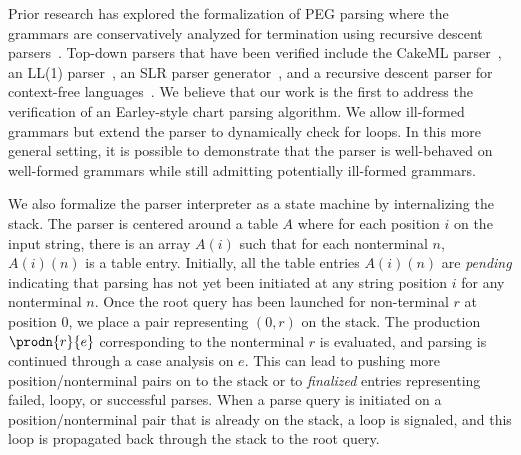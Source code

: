 Prior research has explored the formalization of PEG parsing
where the grammars are conservatively analyzed for termination using recursive
descent parsers~\cite{trx,blaudeau2020verified}\@.  Top-down parsers
that have been verified include the CakeML parser~\cite{DBLP:conf/popl/KumarMNO14},
an LL(1) parser~\cite{DBLP:conf/itp/LasserCFR19}, an SLR parser generator~\cite{conf/esop/BarthwalN09}, and a recursive descent parser for context-free languages~\cite{conf/cpp/Ridge11}\@.  We believe that our work is the first to address the
verification of an Earley-style chart parsing algorithm.  We allow ill-formed
grammars but extend the parser to dynamically check for loops.  
In this more general setting, it is possible to demonstrate that the
parser is well-behaved on well-formed grammars while still admitting potentially
ill-formed grammars.  

We also formalize the parser interpreter as a state machine by
internalizing the stack. The parser is centered around a table
$A$ where for each position $i$ on the input string, there is
an array $A(i)$ such that for each nonterminal $n$, $A(i)(n)$ is a
table entry.  Initially, all the table entries $A(i)(n)$ are
\emph{pending} indicating that parsing has not yet been initiated at
any string position $i$ for any nonterminal $n$\@.  Once the root
query has been launched for non-terminal $r$ at position $0$, we place
a pair representing $(0, r)$ on the stack.  The production
$\prodn{r}{e}$ corresponding to the nonterminal $r$ is evaluated, and
parsing is continued through a case analysis on $e$.  This can lead to
pushing more position/nonterminal pairs on to the stack or to \emph{finalized}
entries representing failed, loopy, or successful parses.  When a parse query is
initiated on a position/nonterminal pair that is already on the stack,
a loop is signaled, and this loop is propagated back through the stack
to the root query.

